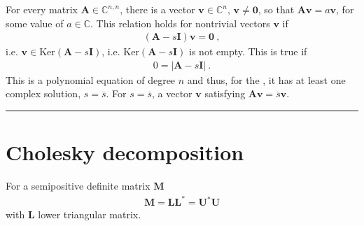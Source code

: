 \documentclass[letterpaper,10pt,english]{jupyterBook}
\begin{document}
\sphinxAtStartPar
For every matrix \(\mathbf{A} \in \mathbb{C}^{n,n}\), there is a vector \(\mathbf{v} \in \mathbb{C}^n\), \(\mathbf{v} \ne \mathbf{0}\), so that \(\mathbf{A} \mathbf{v} = a \mathbf{v}\), for some value of \(a \in \mathbb{C}\). This relation holds for non\sphinxhyphen{}trivial vectors \(\mathbf{v}\) if
\begin{equation*}
\begin{split}\left( \mathbf{A} - s \mathbf{I} \right) \mathbf{v} = \mathbf{0} \ ,\end{split}
\end{equation*}
\sphinxAtStartPar
i.e. \(\mathbf{v} \in \text{Ker}\left( \mathbf{A} - s \mathbf{I} \right)\), i.e. \(\text{Ker}\left( \mathbf{A} - s \mathbf{I} \right)\) is not empty.
This is true if
\begin{equation*}
\begin{split}0 = \left| \mathbf{A} - s \mathbf{I} \right| \ .\end{split}
\end{equation*}
\sphinxAtStartPar
This is a polynomial equation of degree \(n\) and thus, for the {\hyperref[\detokenize{ch/complex/algebra:complex-algebra-fundamental-theorem}]{}}, it has at least one complex solution, \(s = \overline{s}\). For \(s = \overline{s}\), a vector \(\mathbf{v}\) satisfying \(\mathbf{A} \mathbf{v} = \overline{s} \mathbf{v}\).


\bigskip\hrule\bigskip


\sphinxstepscope


\section{Cholesky decomposition}
\label{\detokenize{ch/linear-algebra/cholesky:cholesky-decomposition}}\label{\detokenize{ch/linear-algebra/cholesky:math-cholesky}}\label{\detokenize{ch/linear-algebra/cholesky::doc}}
\sphinxAtStartPar
For a semi\sphinxhyphen{}positive definite matrix \(\mathbf{M}\)
\begin{equation*}
\begin{split}\mathbf{M} = \mathbf{L} \mathbf{L}^* = \mathbf{U}^* \mathbf{U}\end{split}
\end{equation*}
\sphinxAtStartPar
with \(\mathbf{L}\) lower triangular matrix.

\sphinxstepscope
\end{document}
